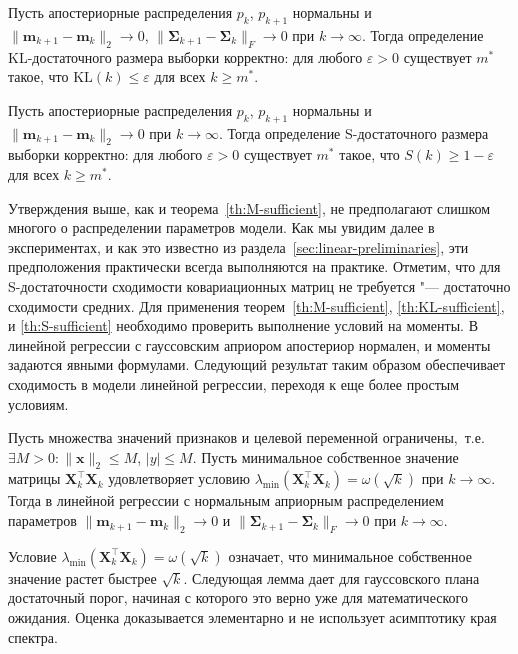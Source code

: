 \begin{theorem}\label{th:KL-sufficient}
    Пусть апостериорные распределения $p_k$, $p_{k+1}$ нормальны и $\|\mathbf{m}_{k+1} - \mathbf{m}_k\|_2 \to 0$, $\|\boldsymbol{\Sigma}_{k+1} - \boldsymbol{\Sigma}_k\|_F \to 0$ при $k \to \infty$. Тогда определение KL-достаточного размера выборки корректно: для любого $\varepsilon > 0$ существует $m^*$ такое, что $\mathrm{KL}(k) \leqslant \varepsilon$ для всех $k \geqslant m^*$.
\end{theorem}

\begin{theorem}\label{th:S-sufficient}
    Пусть апостериорные распределения $p_k$, $p_{k+1}$ нормальны и $\|\mathbf{m}_{k+1} - \mathbf{m}_k\|_2 \to 0$ при $k \to \infty$. Тогда определение S-достаточного размера выборки корректно: для любого $\varepsilon > 0$ существует $m^*$ такое, что $S(k) \geqslant 1 - \varepsilon$ для всех $k \geqslant m^*$.
\end{theorem}

Утверждения выше, как и теорема~\ref{th:M-sufficient}, не предполагают слишком многого о распределении параметров модели. Как мы увидим далее в экспериментах, и как это известно из раздела~\ref{sec:linear-preliminaries}, эти предположения практически всегда выполняются на практике. Отметим, что для S-достаточности сходимости ковариационных матриц не требуется "--- достаточно сходимости средних. Для применения теорем~\ref{th:M-sufficient}, \ref{th:KL-sufficient}, и \ref{th:S-sufficient} необходимо проверить выполнение условий на моменты. В линейной регрессии с гауссовским априором апостериор нормален, и моменты задаются явными формулами. Следующий результат таким образом обеспечивает сходимость в модели линейной регрессии, переходя к еще более простым условиям.

\begin{theorem}\label{th:moments}
    Пусть множества значений признаков и целевой переменной ограничены,~т.\:е. $\exists M > 0: \|\mathbf{x}\|_2 \leqslant M$, $|y| \leqslant M$. Пусть минимальное собственное значение матрицы $\mathbf{X}_k^\top \mathbf{X}_k$ удовлетворяет условию $\lambda_{\min}(\mathbf{X}_k^\top \mathbf{X}_k) = \omega(\sqrt{k})$ при $k \to \infty$. Тогда в линейной регрессии с нормальным априорным распределением параметров $\|\mathbf{m}_{k+1} - \mathbf{m}_k\|_2 \to 0$ и $\|\boldsymbol{\Sigma}_{k+1} - \boldsymbol{\Sigma}_k\|_F \to 0$ при $k \to \infty$.
\end{theorem}

Условие $\lambda_{\min}(\mathbf{X}_k^\top \mathbf{X}_k) = \omega(\sqrt{k})$ означает, что минимальное собственное значение растет быстрее $\sqrt{k}$. Следующая лемма дает для гауссовского плана достаточный порог, начиная с которого это верно уже для математического ожидания. Оценка доказывается элементарно и не использует асимптотику края спектра.

